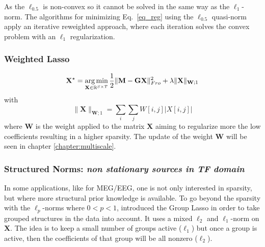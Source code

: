 As the $\ell_{0.5}$ is non-convex so it cannot be solved in the same way as the $\ell_1$-norm. The algorithms for minimizing Eq.~\ref{eq_reg} using the $\ell_{0.5}$ quasi-norm apply an iterative reweighted approach, where each iteration solves the convex problem with an $\ell_1$ regularization.
\adjustwidth{1em}{0pt}

\subsubsection*{Weighted Lasso}
\begin{equation} \label{eq_wlasso}
	\mathbf{X}^\star = \mathop{\mathrm{arg}\,\mathrm{min}}_{\mathbf{X}\in\mathbb{R}^{S\times T}}\frac{1}{2}\|\mathbf{M}-\mathbf{GX}\|_{Fro}^2 + \lambda\|\mathbf{X}\|_{\mathbf{W};1}
\end{equation}
with
\begin{equation*}
	\|\mathbf{X}\|_{\mathbf{W};1}=\sum_i\sum_j W[i,j]|X[i,j]|
\end{equation*}
where $\mathbf{W}$ is the weight applied to the matrix $\mathbf{X}$ aiming to regularize more the low coefficients resulting in a higher sparsity. The update of the weight $\mathbf{W}$ will be seen in chapter \ref{chapter:multiscale}.
\endadjustwidth

\subsubsection*{Structured Norms: \textit{non stationary sources in TF domain}}
In some applications, like for MEG/EEG, one is not only interested in sparsity, but where more structural prior knowledge is available. To go beyond the sparsity with the $\ell_p$-norms where $0<p<1$, \cite{yuan2006model} introduced the Group Lasso in order to take grouped structures  in the data into account. It uses a mixed $\ell_2$ and $\ell_1$-norm on $\mathbf{X}$. The idea is to keep a small number of groups active ($\ell_1$) but once a group is active, then the coefficients of that group will be all nonzero ($\ell_2$).
\adjustwidth{1em}{0pt}
\vspace{-10pt}
